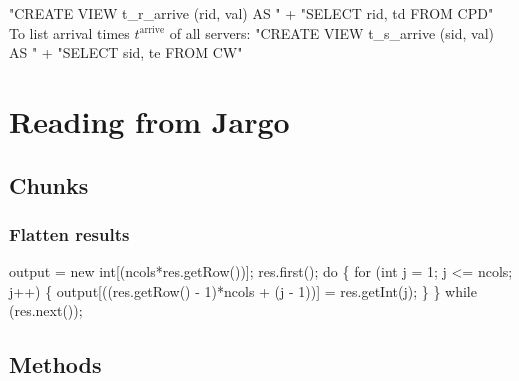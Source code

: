\nwenddocs{}\endmoddef{}
"CREATE VIEW t_r_arrive (rid, val) AS "
  + "SELECT rid, td FROM CPD"
\nwendcode{}\nwdocspar
To list arrival times $t^\textrm{arrive}$ of all servers:
\nwenddocs{}\endmoddef{}
"CREATE VIEW t_s_arrive (sid, val) AS "
  + "SELECT sid, te FROM CW"
\nwendcode{}\nwdocspar

\nwenddocs{}\chapter{Reading from Jargo}
\label{read}

\section{Chunks}

\subsection{Flatten results}
\nwenddocs{}\endmoddef{}
output = new int[(ncols*res.getRow())];
res.first();
do \{
  for (int j = 1; j <= ncols; j++) \{
    output[((res.getRow() - 1)*ncols + (j - 1))] = res.getInt(j);
  \}
\} while (res.next());
\nwendcode{}\nwdocspar

\section{Methods}

